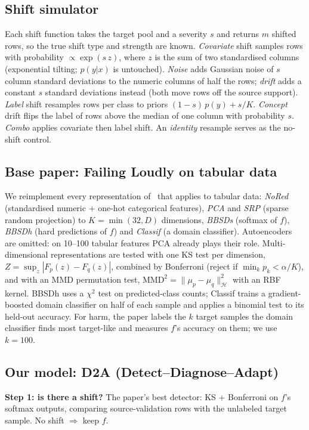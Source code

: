 \documentclass[conference]{IEEEtran}
\newcommand{\Dtwo}{\textsc{D2A}}
\begin{document}
\subsection{Shift simulator}
Each shift function takes the target pool and a severity $s$ and returns $m$ shifted rows, so the true shift type and strength are known. \emph{Covariate} shift samples rows with probability $\propto\exp(s\,z)$, where $z$ is the sum of two standardised columns (exponential tilting; $p(y|x)$ is untouched). \emph{Noise} adds Gaussian noise of $s$ column standard deviations to the numeric columns of half the rows; \emph{drift} adds a constant $s$ standard deviations instead (both move rows off the source support). \emph{Label} shift resamples rows per class to priors $(1-s)\,p(y)+s/K$. \emph{Concept} drift flips the label of rows above the median of one column with probability $s$. \emph{Combo} applies covariate then label shift. An \emph{identity} resample serves as the no-shift control.

\subsection{Base paper: Failing Loudly on tabular data}
We reimplement every representation of~\cite{rabanser2019failing} that applies to tabular data: \emph{NoRed} (standardised numeric + one-hot categorical features), \emph{PCA} and \emph{SRP} (sparse random projection) to $K=\min(32,D)$ dimensions, \emph{BBSDs} (softmax of $f$), \emph{BBSDh} (hard predictions of $f$) and \emph{Classif} (a domain classifier). Autoencoders are omitted: on 10--100 tabular features PCA already plays their role. Multi-dimensional representations are tested with one KS test per dimension, $Z=\sup_z|F_p(z)-F_q(z)|$, combined by Bonferroni (reject if $\min_k p_k<\alpha/K$), and with an MMD permutation test, $\mathrm{MMD}^2=\lVert\mu_p-\mu_q\rVert^2_{\mathcal H}$ with an RBF kernel. BBSDh uses a $\chi^2$ test on predicted-class counts; Classif trains a gradient-boosted domain classifier on half of each sample and applies a binomial test to its held-out accuracy. For harm, the paper labels the $k$ target samples the domain classifier finds most target-like and measures $f$'s accuracy on them; we use $k=100$.

\subsection{Our model: \Dtwo{} (Detect--Diagnose--Adapt)}
\textbf{Step 1: is there a shift?} The paper's best detector: KS + Bonferroni on $f$'s softmax outputs, comparing source-validation rows with the unlabeled target sample. No shift $\Rightarrow$ keep $f$.
\end{document}
